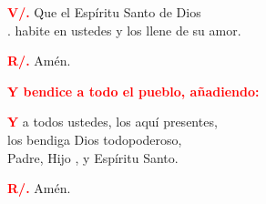 \documentclass[12pt, letterpaper, spanish]{report}
\begin{document}
\Large \hspace{-0.9cm} {\bfseries \textcolor{red}{V/.}} \hspace{0.5cm} Que el Esp\'iritu Santo de Dios\\
.\hspace{1.5cm} habite en ustedes y los llene de su amor.\newline

\Large \hspace{-0.9cm} {\bfseries \textcolor{red}{R/.}} \hspace{0.5cm} Am\'en.\newline

\large{\bfseries \textcolor{red}{Y bendice a todo el pueblo, a\~nadiendo:}}\newline

\Large \lettrine{\bfseries \textcolor{red}{Y}}{} a todos ustedes, los aqu\'i presentes,\\
los bendiga Dios todopoderoso,\\
Padre, Hijo \Huge{\textcolor{red}{}} \Large, y Esp\'iritu Santo.\newline

\Large \hspace{-0.9cm} {\bfseries \textcolor{red}{R/.}} \hspace{0.5cm} Am\'en.\newline

\end{document}

